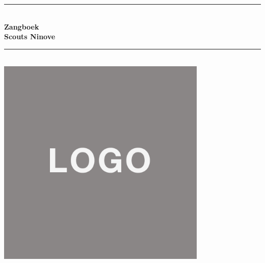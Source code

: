 \begin{titlepage}
\newcommand{\HRule}{\rule{\linewidth}{0.5mm}}
\center
\HRule \\[0.4cm]
{ \huge \bfseries Zangboek\\  Scouts Ninove}\\[0.03cm]
\HRule \\[1.5cm]
\includegraphics[width=10cm]{./images/logo.png}
\vfill 
\end{titlepage}